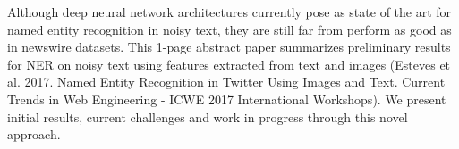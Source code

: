 Although deep neural network architectures currently pose as state of the art for named entity recognition in noisy text, they are still far from perform as good as in newswire datasets. This 1-page abstract paper summarizes preliminary results for NER on noisy text using features extracted from text and images (Esteves et al. 2017. Named Entity Recognition in Twitter Using Images and Text. Current Trends in Web Engineering - ICWE 2017 International Workshops). We present initial results, current challenges and work in progress through this novel approach.
